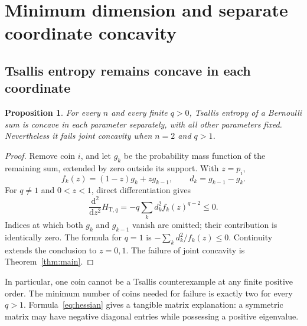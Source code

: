 \documentclass[11pt]{article}
\numberwithin{equation}{section}
\newtheorem{proposition}[theorem]{Proposition}
\theoremstyle{definition}
\theoremstyle{remark}
\begin{document}
\section{Minimum dimension and separate coordinate concavity}
\subsection{Tsallis entropy remains concave in each coordinate}
\begin{proposition}\label{prop:separate}
For every $n$ and every finite $q>0$, Tsallis entropy of a Bernoulli sum is
concave in each parameter separately, with all other parameters fixed.
Nevertheless it fails joint concavity when $n=2$ and $q>1$.
\end{proposition}
\begin{proof}
Remove coin $i$, and let $g_k$ be the probability mass function of the
remaining sum, extended by zero outside its support. With $z=p_i$,
\[
 f_k(z)=(1-z)g_k+zg_{k-1},\qquad d_k=g_{k-1}-g_k.
\]
For $q\ne1$ and $0<z<1$, direct differentiation gives
\begin{equation}
 \frac{\mathrm d^2}{\mathrm dz^2}H_{\mathrm T,q}
 =-q\sum_k d_k^2 f_k(z)^{q-2}\leq0.\label{eq:separate}
\end{equation}
Indices at which both $g_k$ and $g_{k-1}$ vanish are omitted; their
contribution is identically zero. The formula for $q=1$ is
$-\sum_k d_k^2/f_k(z)\leq0$. Continuity extends the conclusion to $z=0,1$.
The failure of joint concavity is Theorem~\ref{thm:main}.
\end{proof}

In particular, one coin cannot be a Tsallis counterexample at any finite
positive order. The minimum number of coins needed for failure is exactly
two for every $q>1$. Formula~\eqref{eq:hessian} gives a tangible matrix
explanation: a symmetric matrix may have negative diagonal entries while
possessing a positive eigenvalue.
\end{document}
